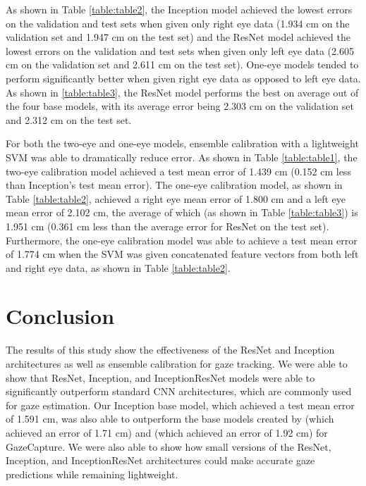 \documentclass{article}
\begin{document}
As shown in Table \ref{table:table2}, the Inception model achieved the lowest errors on the validation and test sets when given only right eye data (1.934 cm on the validation set and 1.947 cm on the test set) and the ResNet model achieved the lowest errors on the validation and test sets when given only left eye data (2.605 cm on the validation set and 2.611 cm on the test set). One-eye models tended to perform significantly better when given right eye data as opposed to left eye data. As shown in \ref{table:table3}, the ResNet model performs the best on average out of the four base models, with its average error being 2.303 cm on the validation set and 2.312 cm on the test set.

For both the two-eye and one-eye models, ensemble calibration with a lightweight SVM was able to dramatically reduce error. As shown in Table \ref{table:table1}, the two-eye calibration model achieved a test mean error of 1.439 cm (0.152 cm less than Inception's test mean error). The one-eye calibration model, as shown in Table \ref{table:table2}, achieved a right eye mean error of 1.800 cm and a left eye mean error of 2.102 cm, the average of which (as shown in Table \ref{table:table3}) is 1.951 cm (0.361 cm less than the average error for ResNet on the test set). Furthermore, the one-eye calibration model was able to achieve a test mean error of 1.774 cm when the SVM was given concatenated feature vectors from both left and right eye data, as shown in Table \ref{table:table2}.

\section{Conclusion}

The results of this study show the effectiveness of the ResNet and Inception architectures as well as ensemble calibration for gaze tracking. We were able to show that ResNet, Inception, and InceptionResNet models were able to significantly outperform standard CNN architectures, which are commonly used for gaze estimation. Our Inception base model, which achieved a test mean error of 1.591 cm, was also able to outperform the base models created by \cite{mitpaper} (which achieved an error of 1.71 cm) and \cite{googlepaper} (which achieved an error of 1.92 cm) for GazeCapture. We were also able to show how small versions of the ResNet, Inception, and InceptionResNet architectures could make accurate gaze predictions while remaining lightweight.
\end{document}
